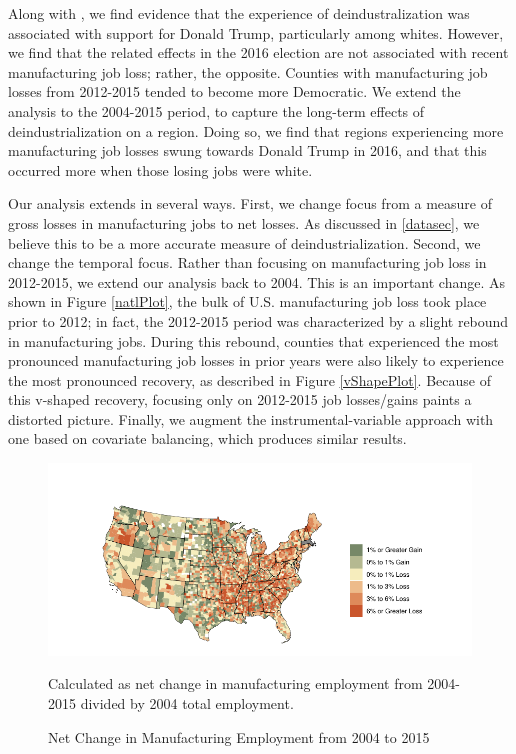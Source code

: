 \documentclass[]{AEA}
\begin{document}
Along with \cite{Baccini21}, we find evidence that the experience of
deindustralization was associated with support for Donald Trump,
particularly among whites. However, we find that the related effects in
the 2016 election are not associated with recent manufacturing job loss;
rather, the opposite. Counties with manufacturing job losses from
2012-2015 tended to become more Democratic. We extend the analysis to
the 2004-2015 period, to capture the long-term effects of
deindustrialization on a region. Doing so, we find that regions
experiencing more manufacturing job losses swung towards Donald Trump in
2016, and that this occurred more when those losing jobs were white.

Our analysis extends \cite{Baccini21} in several ways. First, we change
focus from a measure of gross losses in manufacturing jobs to net
losses. As discussed in \ref{datasec}, we believe this to be a more
accurate measure of deindustrialization. Second, we change the temporal
focus. Rather than focusing on manufacturing job loss in 2012-2015, we
extend our analysis back to 2004. This is an important change. As shown
in Figure \ref{natlPlot}, the bulk of U.S. manufacturing job loss took
place prior to 2012; in fact, the 2012-2015 period was characterized by
a slight rebound in manufacturing jobs. During this rebound, counties
that experienced the most pronounced manufacturing job losses in prior
years were also likely to experience the most pronounced recovery, as
described in Figure \ref{vShapePlot}. Because of this v-shaped recovery,
focusing only on 2012-2015 job losses/gains paints a distorted picture.
Finally, we augment the instrumental-variable approach with one based on
covariate balancing, which produces similar results.

\begin{figure} \label{ManuMap}
\caption{Net Change in Manufacturing Employment from 2004 to 2015}

\begin{center}\includegraphics{Final-Draft_files/figure-latex/unnamed-chunk-2-1} \end{center}

\begin{figurenotes}
Calculated as net change in manufacturing employment from 2004-2015 divided by 2004 total employment.
\end{figurenotes}
\end{figure}
\end{document}
